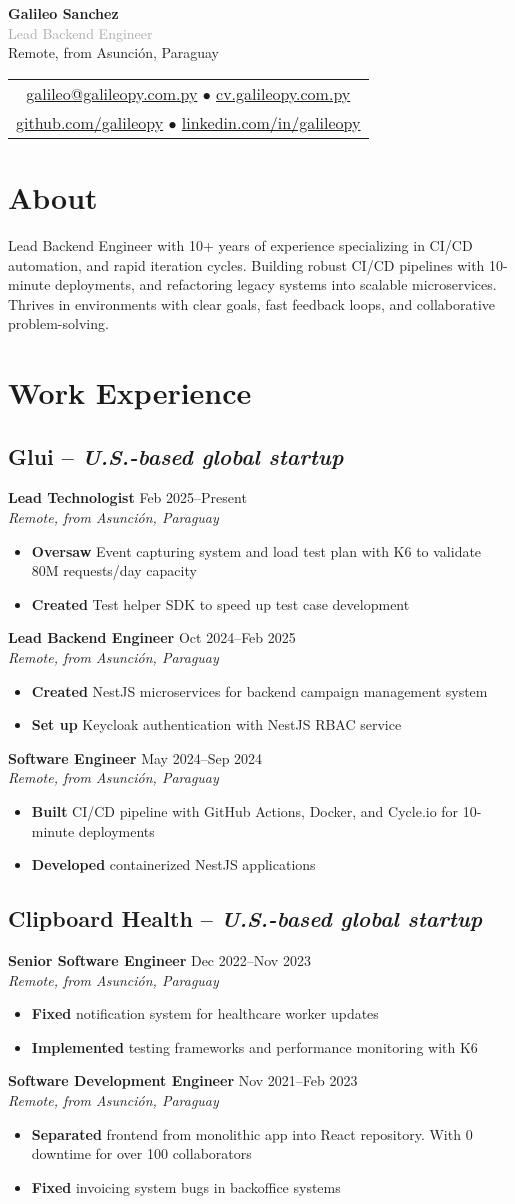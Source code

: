 \documentclass[11pt,a4paper]{article}
\newcommand{\actionverb}[1]{\textcolor{actioncolor}{\textbf{#1}}}
\newcommand{\cvheader}[5]{
  \begin{center}
    {\Huge \textbf{#1}}\\[0.4em]
    {\Large \textcolor{darkgray}{#2}}\\[1em]
    
    \textcolor{mediumgray}{#3}\\[0.6em]
    
    \begin{tabular}{c}
      \href{mailto:#4}{#4} $\bullet$ \href{https://#5}{#5}\\[0.3em]
      \href{https://github.com/galileopy}{github.com/galileopy} $\bullet$ 
      \href{https://www.linkedin.com/in/galileopy}{linkedin.com/in/galileopy}
    \end{tabular}
  \end{center}
  \vspace{1.2em}
}
\newcommand{\cvcompany}[3]{
  \subsection{#1 \textcolor{mediumgray}{#2}}
  #3
  \vspace{0.5em}
}
\newcommand{\cvrole}[4]{
  \textbf{#1} \hfill \textcolor{mediumgray}{\small #2}\\
  \textit{#3}
  \begin{itemize}
    #4
  \end{itemize}
  \vspace{1em}
}
\begin{document}
\cvheader{Galileo Sanchez}{Lead Backend Engineer}{Remote, from Asunción, Paraguay}{galileo@galileopy.com.py}{cv.galileopy.com.py}

\section{About}
Lead Backend Engineer with 10+ years of experience specializing in CI/CD automation, and rapid iteration cycles. Building robust CI/CD pipelines with 10-minute deployments, and refactoring legacy systems into scalable microservices. Thrives in environments with clear goals, fast feedback loops, and collaborative problem-solving.

\section{Work Experience}

\cvcompany{Glui}{-- \textit{U.S.-based global startup}}{
  \cvrole{Lead Technologist}{Feb 2025--Present}{Remote, from Asunción, Paraguay}{
    \item \actionverb{Oversaw} Event capturing system and load test plan with K6 to validate 80M requests/day capacity
    \item \actionverb{Created} Test helper SDK to speed up test case development
  }
  
  \cvrole{Lead Backend Engineer}{Oct 2024--Feb 2025}{Remote, from Asunción, Paraguay}{
    \item \actionverb{Created} NestJS microservices for backend campaign management system
    \item \actionverb{Set up} Keycloak authentication with NestJS RBAC service
  }
  
  \cvrole{Software Engineer}{May 2024--Sep 2024}{Remote, from Asunción, Paraguay}{
    \item \actionverb{Built} CI/CD pipeline with GitHub Actions, Docker, and Cycle.io for 10-minute deployments
    \item \actionverb{Developed} containerized NestJS applications
  }
}

\cvcompany{Clipboard Health}{-- \textit{U.S.-based global startup}}{
  \cvrole{Senior Software Engineer}{Dec 2022--Nov 2023}{Remote, from Asunción, Paraguay}{
    \item \actionverb{Fixed} notification system for healthcare worker updates
    \item \actionverb{Implemented} testing frameworks and performance monitoring with K6
  }
  
  \cvrole{Software Development Engineer}{Nov 2021--Feb 2023}{Remote, from Asunción, Paraguay}{
    \item \actionverb{Separated} frontend from monolithic app into React repository. With 0 downtime for over 100 collaborators
    \item \actionverb{Fixed} invoicing system bugs in backoffice systems
  }
}
\end{document}
